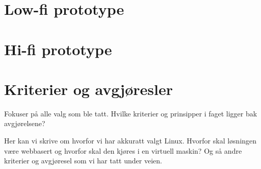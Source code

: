 \section{Low-fi prototype}

\section{Hi-fi prototype}

\section{Kriterier og avgjøresler}
Fokuser på alle valg som ble tatt. Hvilke kriterier og 
prinsipper i faget ligger bak avgjørelsene? 

Her kan vi skrive om hvorfor vi har akkuratt valgt Linux. Hvorfor skal løsningen være webbasert og hvorfor skal den kjøres i en virtuell maskin? Og så andre kriterier og avgjøresel som vi har tatt under veien. 